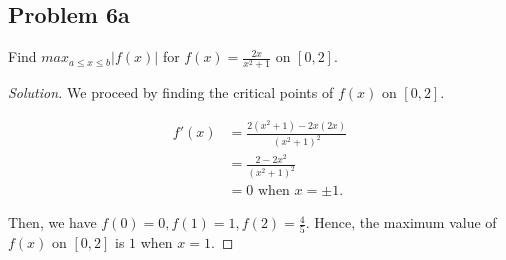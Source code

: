\documentclass{article}
\begin{document}
\subsection*{Problem 6a}
Find $max_{a\le x\le b}|f(x)|$ for $f(x) = \frac{2x}{x^2+1}$ on $[0,2]$.
\begin{proof}[Solution]
    We proceed by finding the critical points of $f(x)$ on $[0,2]$.

    \begin{align*}
        f'(x) & = \frac{2(x^2+1) - 2x(2x)}{(x^2+1)^2} \\
              & = \frac{2 - 2x^2}{(x^2+1)^2} \\
              & = 0 \text{ when } x = \pm 1.
    \end{align*}

    Then, we have $f(0) = 0, f(1) = 1, f(2) = \frac{4}{5}$. Hence, the maximum value of $f(x)$ on 
    $[0,2]$ is $1$ when $x=1$.
\end{proof}
\end{document}
